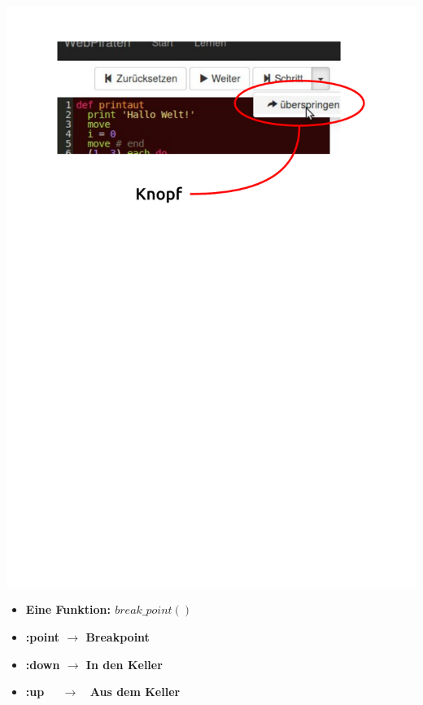 \begin{frame}
	\ \\
	\begin{center}
		\includegraphics[scale=0.5]{scopes/button.pdf}
	\end{center}
\end{frame}

\begin{frame}
	\begin{itemize}
		\item[]\textbf{Eine Funktion: $break\_point()$} \\
		\item[]\textbf{:point $\rightarrow$ Breakpoint} \\
		\item[]\textbf{:down $\rightarrow$ In den Keller} \\
		\item[]\textbf{:up \ \ $\rightarrow$ \ Aus dem Keller} \\
	\end{itemize}
\end{frame}

